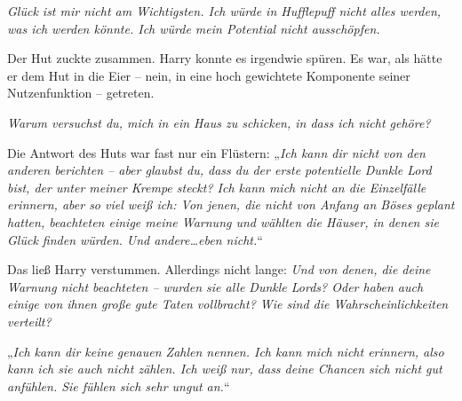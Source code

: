 \emph{Glück ist mir nicht am Wichtigsten. Ich würde in Hufflepuff nicht alles werden, was ich werden könnte. Ich würde mein Potential nicht ausschöpfen.}

Der Hut zuckte zusammen. Harry konnte es irgendwie spüren. Es war, als hätte er dem Hut in die Eier – nein, in eine hoch gewichtete Komponente seiner Nutzenfunktion – getreten.

\emph{Warum versuchst du, mich in ein Haus zu schicken, in dass ich nicht gehöre?}

Die Antwort des Huts war fast nur ein Flüstern: „\emph{Ich kann dir nicht von den anderen berichten – aber glaubst du, dass du der erste potentielle Dunkle Lord bist, der unter meiner Krempe steckt? Ich kann mich nicht an die Einzelfälle erinnern, aber so viel weiß ich: Von jenen, die nicht von Anfang an Böses geplant hatten, beachteten einige meine Warnung und wählten die Häuser, in denen sie Glück finden würden. Und andere…eben nicht.}“

Das ließ Harry verstummen. Allerdings nicht lange: \emph{Und von denen, die deine Warnung \emph{nicht} beachteten – wurden sie \emph{alle} Dunkle Lords? Oder haben auch einige von ihnen große gute Taten vollbracht? Wie sind die Wahrscheinlichkeiten verteilt? }

„\emph{Ich kann dir keine genauen Zahlen nennen. Ich kann mich nicht erinnern, also kann ich sie auch nicht zählen. Ich weiß nur, dass deine Chancen sich nicht gut anfühlen. Sie fühlen sich \emph{sehr} ungut an.}“

